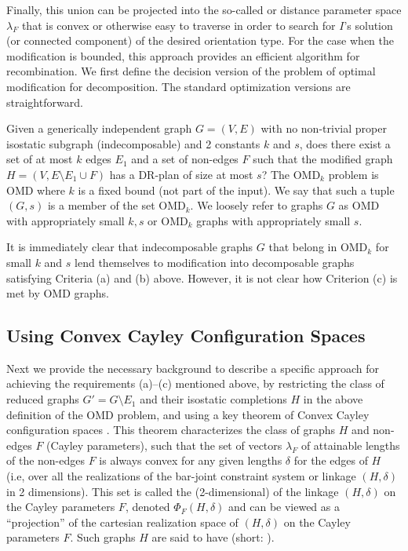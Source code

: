 \medskip\noindent
{}
Finally, this union can be projected into the so-called  or distance parameter space $\lambda_F$ that is convex or otherwise easy to traverse in order to search for $I$'s solution (or connected component) of the desired orientation type. For the case when the modification is bounded, this approach provides an efficient algorithm for recombination. We first define the decision version of the problem of optimal modification for decomposition. The standard optimization versions are straightforward.


Given a generically independent graph $G = (V,E)$ with no non-trivial proper isostatic subgraph (indecomposable) and 2 constants $k$ and $s$, does there exist a set of at most $k$  edges $E_1$ and a set of non-edges $F$ such that the modified graph $H = (V, E\setminus E_1 \cup F)$ has a DR-plan of size at most $s$?  The OMD$_k$ problem is  OMD where $k$ is a fixed bound (not part of the input).   We say that such a tuple $(G,s)$ is a member of the set OMD$_k$. We loosely refer to graphs $G$ as OMD with appropriately small $k,s$ or OMD$_k$ graphs with appropriately small $s$.


It is immediately clear that indecomposable graphs $G$ that belong in OMD$_k$ for small $k$ and $s$  lend themselves to modification  into decomposable graphs satisfying Criteria (a) and (b) above. However, it is not clear how Criterion (c) is met by OMD graphs.
%
\subsection{Using Convex Cayley Configuration Spaces}
\label{sec:2-tree-reduction}
%
Next we provide the necessary background to describe a specific approach for achieving the requirements (a)--(c) mentioned above, by restricting the class of reduced graphs $G' = G\setminus E_1$ and their isostatic completions $H$ in the above definition of the OMD problem, and using a key theorem of Convex Cayley configuration spaces \cite{sitharam2010convex}. This theorem characterizes the class of graphs $H$ and non-edges $F$ (Cayley parameters), such that the set of vectors $\lambda_F$ of  attainable lengths of the non-edges $F$ is always convex for any given lengths $\delta$ for the edges of $H$ (i.e, over all the realizations of the bar-joint constraint system or linkage $(H,\delta)$ in 2 dimensions). This set is called the (2-dimensional)  of the linkage $(H,\delta)$ on the Cayley parameters $F$, denoted $\Phi_F(H,\delta)$ and can be viewed as a ``projection'' of the cartesian realization space of $(H,\delta)$ on the Cayley parameters $F$. Such graphs $H$ are said to have  (short: ).

